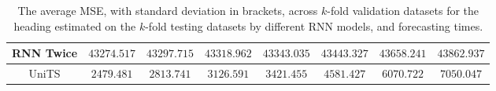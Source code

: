 \begin{table}[!ht]
{\begin{tabular}{|c|c|c|c|c|c|c|c|}
			RNN Twice & $43274.517$ & $43297.715$ & $43318.962$ & $43343.035$ & $43443.327$ & $43658.241$ & $43862.937$ \\ \hline
			UniTS & $2479.481$ & $2813.741$ & $3126.591$ & $\mathbf{3421.455}$ & $\mathbf{4581.427}$ & $\mathbf{6070.722}$ & $\mathbf{7050.047}$ \\ \hline
		\end{tabular}
	}
	\caption{The average MSE, with standard deviation in brackets, across $k$-fold validation datasets for the heading estimated on the $k$-fold testing datasets by different RNN models, and forecasting times.}
	\label{tab:all_direction_MSE}
\end{table}